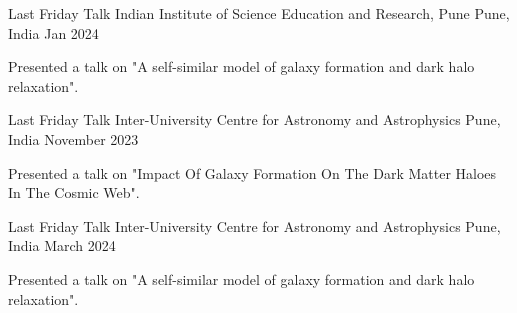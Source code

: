 \begin{cventries}
{
\cventry
{Last Friday Talk}
{Indian Institute of Science Education and Research, Pune}
{Pune, India}
{Jan 2024}
{
\begin{cvitems}
\item {Presented a talk on "A self-similar model of galaxy 
formation and dark halo relaxation".}
\end{cvitems}
}
}

{
\cventry
{Last Friday Talk}
{Inter-University Centre for Astronomy and Astrophysics}
{Pune, India}
{November 2023}
{
\begin{cvitems}
\item {Presented a talk on "Impact Of Galaxy Formation On The Dark Matter Haloes In The Cosmic Web".}
\end{cvitems}
}
}

{
\cventry
{Last Friday Talk}
{Inter-University Centre for Astronomy and Astrophysics}
{Pune, India}
{March 2024}
{
\begin{cvitems}
\item {Presented a talk on "A self-similar model of galaxy 
formation and dark halo relaxation".}
\end{cvitems}
}
}

\end{cventries}